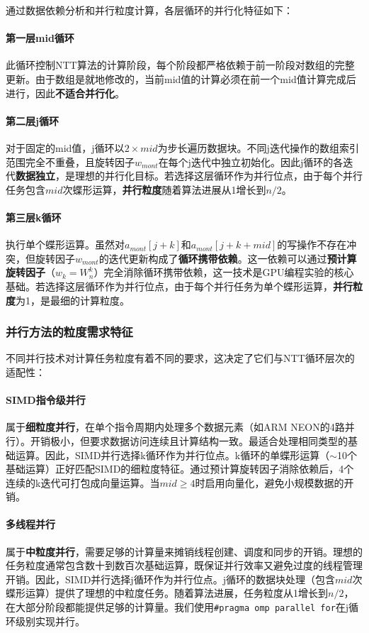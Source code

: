 \documentclass[a4paper]{article}
\begin{document}
通过数据依赖分析和并行粒度计算，各层循环的并行化特征如下：

\paragraph{第一层mid循环} 此循环控制NTT算法的计算阶段，每个阶段都严格依赖于前一阶段对数组的完整更新。由于数组是就地修改的，当前mid值的计算必须在前一个mid值计算完成后进行，因此\textbf{不适合并行化}。

\paragraph{第二层j循环} 对于固定的mid值，j循环以$2 \times mid$为步长遍历数据块。不同j迭代操作的数组索引范围完全不重叠，且旋转因子$w_{mont}$在每个j迭代中独立初始化。因此j循环的各迭代\textbf{数据独立}，是理想的并行化目标。若选择这层循环作为并行位点，由于每个并行任务包含$mid$次蝶形运算，\textbf{并行粒度}随着算法进展从1增长到$n/2$。

\paragraph{第三层k循环} 执行单个蝶形运算。虽然对$a_{mont}[j+k]$和$a_{mont}[j+k+mid]$的写操作不存在冲突，但旋转因子$w_{mont}$的迭代更新构成了\textbf{循环携带依赖}。这一依赖可以通过\textbf{预计算旋转因子}（$w_k = W_n^k$）完全消除循环携带依赖，这一技术是GPU编程实验的核心基础。若选择这层循环作为并行位点，由于每个并行任务为单个蝶形运算，\textbf{并行粒度}为1，是最细的计算粒度。

\subsubsection{并行方法的粒度需求特征}

不同并行技术对计算任务粒度有着不同的要求，这决定了它们与NTT循环层次的适配性：

\paragraph{SIMD指令级并行} 
属于\textbf{细粒度并行}，在单个指令周期内处理多个数据元素（如ARM NEON的4路并行）。开销极小，但要求数据访问连续且计算结构一致。最适合处理相同类型的基础运算。因此，SIMD并行选择k循环作为并行位点。k循环的单蝶形运算（$\sim$10个基础运算）正好匹配SIMD的细粒度特征。通过预计算旋转因子消除依赖后，4个连续的k迭代可打包成向量运算。当$mid \geq 4$时启用向量化，避免小规模数据的开销。

\paragraph{多线程并行} 
属于\textbf{中粒度并行}，需要足够的计算量来摊销线程创建、调度和同步的开销。理想的任务粒度通常包含数十到数百次基础运算，既保证并行效率又避免过度的线程管理开销。因此，SIMD并行选择j循环作为并行位点。j循环的数据块处理（包含$mid$次蝶形运算）提供了理想的中粒度任务。随着算法进展，任务粒度从1增长到$n/2$，在大部分阶段都能提供足够的计算量。我们使用\texttt{\#pragma omp parallel for}在j循环级别实现并行。
\end{document}
